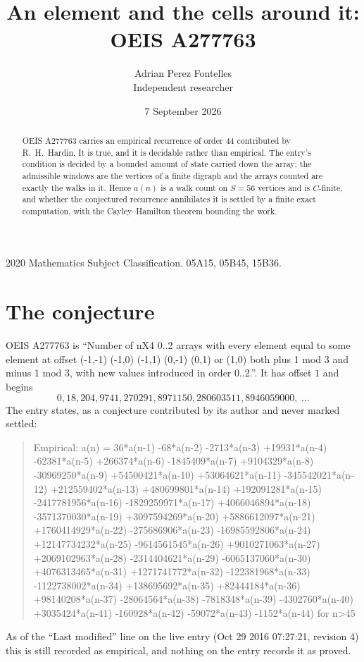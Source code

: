 \documentclass[11pt,a4paper]{article}
\title{An element and the cells around it: OEIS A277763}
\author{Adrian Perez Fontelles\\ \small Independent researcher}
\date{7 September 2026}
\theoremstyle{plain}
\theoremstyle{definition}
\begin{document}
\maketitle

\begin{abstract}
OEIS A277763 carries an empirical recurrence of order $44$ contributed by R.~H.~Hardin. It is
true, and it is decidable rather than empirical. The entry's condition is decided by a bounded amount of state carried down the array; the
admissible windows are the vertices of a finite digraph and the arrays counted are exactly the
walks in it. Hence $a(n)$ is a walk count on $S=56$ vertices and is $C$-finite, and whether the
conjectured recurrence annihilates it is settled by a finite exact computation, with the
Cayley--Hamilton theorem bounding the work.
\end{abstract}

\noindent\small 2020 Mathematics Subject Classification. 05A15, 05B45, 15B36.\normalsize

\section{The conjecture}

OEIS A277763 is ``Number of nX4 0..2 arrays with every element equal to some element at offset (-1,-1) (-1,0) (-1,1) (0,-1) (0,1) or (1,0) both plus 1 mod 3 and minus 1 mod 3, with new values introduced in order 0..2.''. It has offset $1$ and begins
\[
0, 18, 204, 9741, 270291, 8971150, 280603511, 8946059000,\ \dots
\]
The entry states, as a conjecture contributed by its author and never marked settled:
\begin{quote}
Empirical: a(n) = 36*a(n-1) -68*a(n-2) -2713*a(n-3) +19931*a(n-4) -62381*a(n-5) +266374*a(n-6) -1845409*a(n-7) +9104329*a(n-8) -30969250*a(n-9) +54500421*a(n-10) +53064621*a(n-11) -345542021*a(n-12) +212559402*a(n-13) +480699801*a(n-14) +192091281*a(n-15) -2417781956*a(n-16) -1829259971*a(n-17) +4066046894*a(n-18) -3571370030*a(n-19) +3097594269*a(n-20) +5886612097*a(n-21) +1760414929*a(n-22) -275686906*a(n-23) -16985592806*a(n-24) +12147734232*a(n-25) -9614561545*a(n-26) +9010271063*a(n-27) +2069102963*a(n-28) -2314404621*a(n-29) -6065137060*a(n-30) +4076313465*a(n-31) +1271741772*a(n-32) -122381968*a(n-33) -1122738002*a(n-34) +138695692*a(n-35) +82444184*a(n-36) +98140208*a(n-37) -28064564*a(n-38) -7818348*a(n-39) -4302760*a(n-40) +3035424*a(n-41) -160928*a(n-42) -59072*a(n-43) -1152*a(n-44) for n>45
\end{quote}
As of the ``Last modified'' line on the live entry (Oct 29 2016 07:27:21, revision 4) this is still
recorded as empirical, and nothing on the entry records it as proved.
\end{document}
